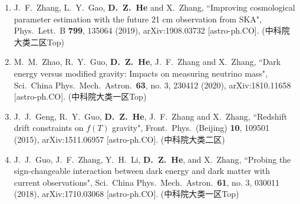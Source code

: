 \begin{enumerate}[leftmargin=*]
    \item J.~F.~Zhang, L.~Y.~Gao, \textbf{D.~Z.~He} and X.~Zhang, ``Improving cosmological parameter estimation with the future 21 cm observation from SKA", Phys.\ Lett.\ B {\bf 799}, 135064 (2019), arXiv:1908.03732 [astro-ph.CO]. (中科院大类二区Top)
     
    \item  M.~M.~Zhao, R.~Y.~Guo, \textbf{D.~Z.~He}, J.~F.~Zhang and X.~Zhang, ``Dark energy versus modified gravity: Impacts on measuring neutrino mass", Sci.\ China Phys.\ Mech.\ Astron.\ {\bf 63}, no. 3, 230412 (2020), arXiv:1810.11658 [astro-ph.CO]. (中科院大类一区Top)
 
    \item J.~J.~Geng, R.~Y.~Guo, \textbf{D.~Z.~He}, J.~F.~Zhang and X.~Zhang, ``Redshift drift constraints on $f(T)$ gravity", Front.\ Phys.\ (Beijing) {\bf 10}, 109501 (2015), arXiv:1511.06957 [astro-ph.CO]. (中科院大类二区)
  
    \item J.~J.~Guo, J.~F.~Zhang, Y.~H.~Li, \textbf{D.~Z.~He}, and X.~Zhang, ``Probing the sign-changeable interaction between dark energy and dark matter with current observations", Sci.\ China Phys.\ Mech.\ Astron.\ {\bf 61}, no. 3, 030011 (2018), arXiv:1710.03068 [astro-ph.CO]. (中科院大类一区Top)

  \end{enumerate}    
